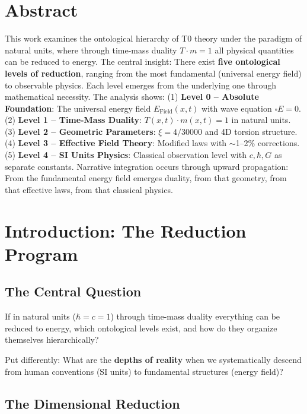 \section*{Abstract}
		This work examines the ontological hierarchy of T0 theory under the paradigm of natural units, where through time-mass duality $T \cdot m = 1$ all physical quantities can be reduced to energy. The central insight: There exist \textbf{five ontological levels of reduction}, ranging from the most fundamental (universal energy field) to observable physics. Each level emerges from the underlying one through mathematical necessity. The analysis shows: (1) \textbf{Level 0 -- Absolute Foundation}: The universal energy field $E_{\text{Field}}(x,t)$ with wave equation $\square E = 0$. (2) \textbf{Level 1 -- Time-Mass Duality}: $T(x,t) \cdot m(x,t) = 1$ in natural units. (3) \textbf{Level 2 -- Geometric Parameters}: $\xi = 4/30000$ and 4D torsion structure. (4) \textbf{Level 3 -- Effective Field Theory}: Modified laws with $\sim$1--2\% corrections. (5) \textbf{Level 4 -- SI Units Physics}: Classical observation level with $c, \hbar, G$ as separate constants. Narrative integration occurs through upward propagation: From the fundamental energy field emerges duality, from that geometry, from that effective laws, from that classical physics.

	
	
	
	\section{Introduction: The Reduction Program}
	
	\subsection{The Central Question}
	
	\begin{important}
		If in natural units ($\hbar = c = 1$) through time-mass duality everything can be reduced to energy, which ontological levels exist, and how do they organize themselves hierarchically?
		
		Put differently: What are the \textbf{depths of reality} when we systematically descend from human conventions (SI units) to fundamental structures (energy field)?
	\end{important}
	
	\subsection{The Dimensional Reduction}
	
